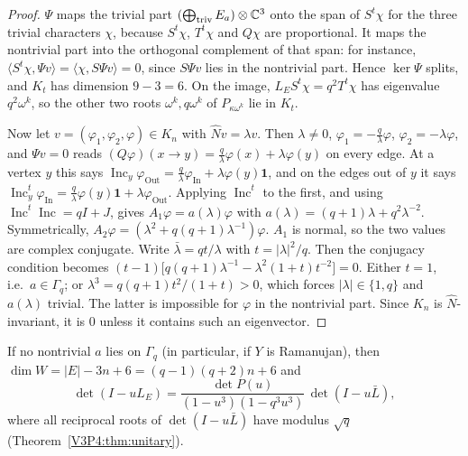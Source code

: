 \begin{proof}
$\Psi$ maps the trivial part $(\bigoplus_{\text{triv}}E_a)\otimes\mathbb{C}^{3}$ onto the span of
$S^{t}\chi$ for the three trivial characters $\chi$, because $S^{t}\chi$, $T^{t}\chi$ and $Q\chi$
are proportional. It maps the nontrivial part into the orthogonal complement of that span: for
instance, $\langle S^{t}\chi,\Psi v\rangle=\langle\chi,S\Psi v\rangle=0$, since $S\Psi v$ lies
in the nontrivial part. Hence $\ker\Psi$ splits, and $K_t$ has dimension $9-3=6$. On the image,
$L_ES^{t}\chi=q^{2}T^{t}\chi$ has eigenvalue $q^{2}\omega^{k}$, so the other two roots
$\omega^{k},q\omega^{k}$ of $P_{\kappa\omega^{k}}$ lie in $K_t$.

Now let $v=(\varphi_1,\varphi_2,\varphi)\in K_n$ with $\widehat Nv=\lambda v$. Then $\lambda\ne0$,
$\varphi_1=-\frac q\lambda\varphi$, $\varphi_2=-\lambda\varphi$, and $\Psi v=0$ reads
$(Q\varphi)(x\to y)=\frac q\lambda\varphi(x)+\lambda\varphi(y)$ on every edge. At a vertex $y$
this says $\operatorname{Inc}_y\varphi_{\mathrm{Out}}=\frac q\lambda\varphi_{\mathrm{In}}+
\lambda\varphi(y)\mathbf 1$, and on the edges out of $y$ it says
$\operatorname{Inc}_y^{t}\varphi_{\mathrm{In}}=\frac q\lambda\varphi(y)\mathbf
1+\lambda\varphi_{\mathrm{Out}}$. Applying $\operatorname{Inc}^{t}$ to the first, and using
$\operatorname{Inc}^{t}\operatorname{Inc}=qI+J$, gives
$A_1\varphi=a(\lambda)\varphi$ with $a(\lambda)=(q+1)\lambda+q^{2}\lambda^{-2}$.
Symmetrically, $A_2\varphi=(\lambda^{2}+q(q+1)\lambda^{-1})\varphi$. $A_1$ is normal, so the two
values are complex conjugate. Write $\bar\lambda=qt/\lambda$ with $t=|\lambda|^{2}/q$. Then
the conjugacy condition becomes $(t-1)\bigl[q(q+1)\lambda^{-1}-\lambda^{2}(1+t)t^{-2}\bigr]=0$.
Either $t=1$, i.e.\ $a\in\Gamma_q$; or $\lambda^{3}=q(q+1)t^{2}/(1+t)>0$, which forces
$|\lambda|\in\{1,q\}$ and $a(\lambda)$ trivial. The latter is impossible for $\varphi$ in
the nontrivial part. Since $K_n$ is $\widehat N$-invariant, it is $0$ unless it contains such
an eigenvector.
\end{proof}

\begin{theorem}[Factorization]\label{V3P4:thm:factor}
If no nontrivial $a$ lies on $\Gamma_q$ (in particular, if $Y$ is Ramanujan), then
$\dim W=|E|-3n+6=(q-1)(q+2)n+6$ and
\[
\det(I-uL_E)=\frac{\det P(u)}{(1-u^{3})(1-q^{3}u^{3})}\,\det(I-u\bar L),
\]
where all reciprocal roots of $\det(I-u\bar L)$ have modulus $\sqrt q$
(Theorem~\ref{V3P4:thm:unitary}).
\end{theorem}

